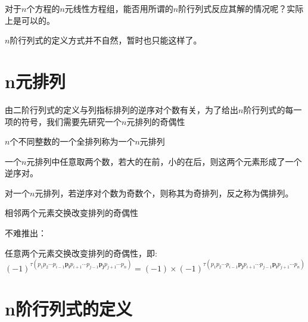 对于$n$个方程的$n$元线性方程组，能否用所谓的$n$阶行列式反应其解的情况呢？实际上是可以的。
\begin{remark}
    $n$阶行列式的定义方式并不自然，暂时也只能这样了。
\end{remark}

\section{n元排列}
由二阶行列式的定义与列指标排列的逆序对个数有关，为了给出$n$阶行列式的每一项的符号，我们需要先研究一个$n$元排列的奇偶性
\begin{definition}
    $n$个不同整数的一个全排列称为一个$n$元排列
\end{definition}
\begin{definition}
    一个$n$元排列中任意取两个数，若大的在前，小的在后，则这两个元素形成了一个逆序对。
\end{definition}
\begin{definition}
    对一个$n$元排列，若逆序对个数为奇数个，则称其为奇排列，反之称为偶排列。
\end{definition}
\begin{theorem}
    相邻两个元素交换改变排列的奇偶性
\end{theorem}
不难推出：
\begin{theorem}
    任意两个元素交换改变排列的奇偶性，即:
    \begin{equation*}
        (-1)^{\tau (p_{1}p_{2}\cdots p_{i-1} \bm{p_{i}} p_{i+1} \cdots p_{j-1} \bm{p_{j}} p_{j+1} \cdots p_{n})}
        = (-1) \times (-1)^{\tau (p_{1}p_{2}\cdots p_{i-1} \bm{p_{j}} p_{i+1} \cdots p_{j-1} \bm{p_{i}} p_{j+1} \cdots p_{n})}
    \end{equation*}
\end{theorem}

\section{n阶行列式的定义}
